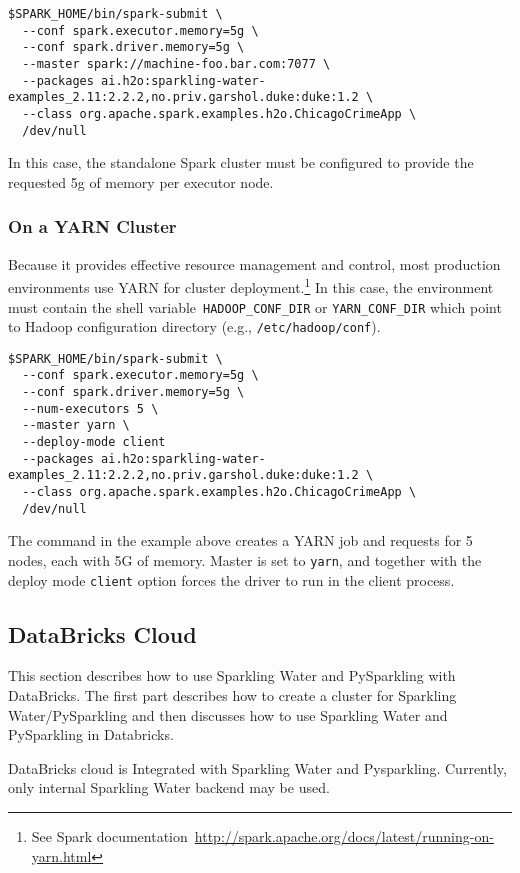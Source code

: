 \begin{lstlisting}[style=Bash]
$SPARK_HOME/bin/spark-submit \ 
  --conf spark.executor.memory=5g \
  --conf spark.driver.memory=5g \
  --master spark://machine-foo.bar.com:7077 \
  --packages ai.h2o:sparkling-water-examples_2.11:2.2.2,no.priv.garshol.duke:duke:1.2 \
  --class org.apache.spark.examples.h2o.ChicagoCrimeApp \
  /dev/null
\end{lstlisting}

In this case, the standalone Spark cluster must be configured to provide the requested 5g of memory per executor node. 

\subsubsection{On a YARN Cluster}
Because it provides effective resource management and control, most production environments use YARN for cluster deployment.\footnote{See Spark documentation~\url{http://spark.apache.org/docs/latest/running-on-yarn.html}} 
In this case, the environment must contain the shell variable~\texttt{HADOOP\_CONF\_DIR} or \texttt{YARN\_CONF\_DIR} which point to Hadoop configuration directory (e.g., \texttt{/etc/hadoop/conf}).

\begin{lstlisting}[style=Bash]
$SPARK_HOME/bin/spark-submit \ 
  --conf spark.executor.memory=5g \
  --conf spark.driver.memory=5g \
  --num-executors 5 \
  --master yarn \
  --deploy-mode client
  --packages ai.h2o:sparkling-water-examples_2.11:2.2.2,no.priv.garshol.duke:duke:1.2 \
  --class org.apache.spark.examples.h2o.ChicagoCrimeApp \
  /dev/null
\end{lstlisting}

The command in the example above creates a YARN job and requests for 5 nodes, each with 5G of memory. Master is set to \texttt{yarn}, and together with the deploy mode \texttt{client} option forces the driver to run in the client process.

\subsection{DataBricks Cloud}
This section describes how to use Sparkling Water and PySparkling with DataBricks.
The first part describes how to create a cluster for Sparkling Water/PySparkling and then discusses how to use Sparkling Water and PySparkling in Databricks.


DataBricks cloud is Integrated with Sparkling Water and Pysparkling. Currently, only internal Sparkling Water backend may
be used.


